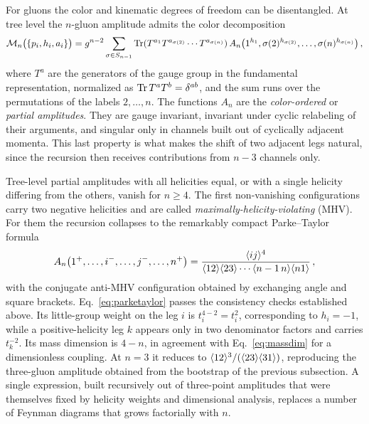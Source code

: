 For gluons the color and kinematic degrees of freedom can be disentangled. At tree level the
$n$-gluon amplitude admits the color decomposition~\cite{Mangano:1990by,Berends:1987cv}
\begin{equation}\label{eq:colordec}
    \mathcal M_n\big(\{p_i,h_i,a_i\}\big) = g^{n-2}\sum_{\sigma\in S_{n-1}}
    \Tr(T^{a_1}T^{a_{\sigma(2)}}\cdots T^{a_{\sigma(n)}})\,
    A_n\big(1^{h_1},\sigma(2)^{h_{\sigma(2)}},\dotsc,\sigma(n)^{h_{\sigma(n)}}\big)\,,
\end{equation}
where $T^a$ are the generators of the gauge group in the fundamental representation, normalized as
$\Tr T^aT^b =\delta^{ab}$, and the sum runs over the permutations of the labels $2,\dotsc,n$. The functions $A_n$ are the \textit{color-ordered} or \textit{partial amplitudes}. They are gauge
invariant, invariant under cyclic relabeling of their arguments, and singular only in channels built
out of cyclically adjacent momenta. This last property is what makes the shift of two adjacent legs
natural, since the recursion then receives contributions from $n-3$ channels only.

Tree-level partial amplitudes with all helicities equal, or with a single helicity differing from
the others, vanish for $n\ge4$. The first non-vanishing configurations carry two negative helicities
and are called \textit{maximally-helicity-violating} (MHV). For them the recursion collapses to the
remarkably compact Parke--Taylor formula~\cite{Parke:1986gb}
\begin{equation}\label{eq:parketaylor}
    A_n\big(1^+,\dotsc,i^-,\dotsc,j^-,\dotsc,n^+\big)
    = \frac{\langle i j \rangle^4}{\langle 1 2 \rangle\langle 2 3 \rangle\cdots\langle n-1\, n \rangle\langle n 1 \rangle}\,,
\end{equation}
with the conjugate anti-MHV configuration obtained by exchanging angle and square brackets.
Eq.~\eqref{eq:parketaylor} passes the consistency checks established above. Its little-group
weight on the leg $i$ is $t_i^{4-2}=t_i^{2}$, corresponding to $h_i=-1$, while a positive-helicity
leg $k$ appears only in two denominator factors and carries $t_k^{-2}$. Its mass dimension is
$4-n$, in agreement with Eq.~\eqref{eq:massdim} for a dimensionless coupling. At $n=3$ it reduces to
$\langle 1 2 \rangle^3/(\langle 2 3 \rangle\langle 3 1 \rangle)$, reproducing the three-gluon amplitude obtained from the
bootstrap of the previous subsection. A single expression, built recursively out of three-point
amplitudes that were themselves fixed by helicity weights and dimensional analysis, replaces a
number of Feynman diagrams that grows factorially with $n$.
